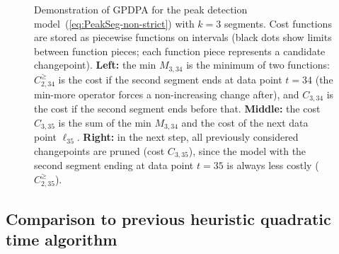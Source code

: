 \documentclass[aoas]{imsart}
\begin{document}
\begin{figure}[t!]
  \centering
  
\vskip -1cm
  \caption{
    Demonstration of GPDPA for the peak detection model~(\ref{eq:PeakSeg-non-strict})
    with $k=3$ segments. Cost functions are stored as piecewise
    functions on intervals (black dots show limits between function
    pieces; each function piece represents a candidate changepoint). 
    \textbf{Left:} the min \textcolor{Min}{$M_{3,34}$} is the
    minimum of two functions: \textcolor{MinMore}{$C^{\geq}_{2,34}$}
    is the cost if the second segment ends at data point $t=34$ (the
    min-more operator forces a non-increasing change after), and
    \textcolor{Ckt}{$C_{3,34}$} is the cost if the second segment ends
    before that. \textbf{Middle:} the cost \textcolor{Ckt}{$C_{3,35}$}
    is the sum of the min \textcolor{Min}{$M_{3,34}$} and the cost of
    the next data point \textcolor{Data}{$\ell_{35}$}. \textbf{Right:}
    in the next step, all previously considered changepoints are
    pruned (cost \textcolor{Ckt}{$C_{3,35}$}), since the model with the second
    segment ending at data point $t=35$ is always less costly
    (\textcolor{MinMore}{$C^{\geq}_{2,35}$}).  }
  \label{fig:min-envelope}
\end{figure}

\subsection{Comparison to previous heuristic quadratic time algorithm}
\end{document}
